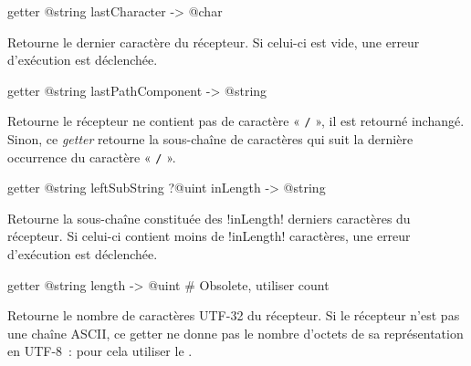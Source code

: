 
\begin{galgas3box}
getter @string lastCharacter -> @char
\end{galgas3box}

Retourne le dernier caractère du récepteur. Si celui-ci est vide, une erreur d'exécution est déclenchée.









\begin{galgas3box}
getter @string lastPathComponent -> @string
\end{galgas3box}

Retourne le récepteur ne contient pas de caractère « \texttt{/} », il est retourné inchangé. Sinon, ce \emph{getter} retourne la sous-chaîne de caractères qui suit la dernière occurrence du caractère « \texttt{/} ».









\begin{galgas3box}
getter @string leftSubString ?@uint inLength -> @string
\end{galgas3box}

Retourne la sous-chaîne constituée des \ggst!inLength! derniers caractères du récepteur. Si celui-ci contient moins de \ggst!inLength! caractères, une erreur d'exécution est déclenchée.









\begin{galgas3box}
getter @string length -> @uint # Obsolete, utiliser count
\end{galgas3box}

Retourne le nombre de caractères UTF-32 du récepteur. Si le récepteur n'est pas une chaîne ASCII, ce getter ne donne pas le nombre d'octets de sa représentation en UTF-8~: pour cela utiliser le .









